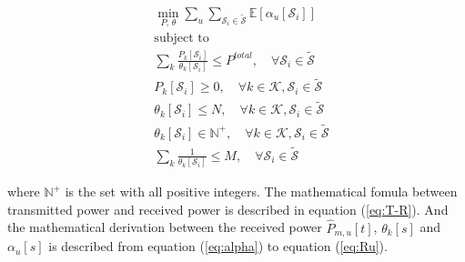 
\begin{subequations} \label{eq:main}
\begin{align}
    &\min_{P,\,\theta} \sum_{u} \sum_{\mathcal{S}_i\in \mathcal{\widetilde{S}}} \mathbb{E}[\alpha_u[\mathcal{S}_i]] \\ 
    &\text{subject to} \nonumber \\
    &\sum_{k} \frac{P_{k}[\mathcal{S}_i]}{\theta_k[\mathcal{S}_i]} \leq P^{total}, \quad \forall \mathcal{S}_i \in \mathcal{\widetilde{S}} \label{eq:power_constraint} \\ 
    &P_k[\mathcal{S}_i]\geq 0, \quad \forall k\in\mathcal{K}, \mathcal{S}_i\in\mathcal{\widetilde{S}} \label{eq:power_nonnegative} \\
    &\theta_k[\mathcal{S}_i] \leq N, \quad \forall k\in\mathcal{K}, \mathcal{S}_i\in\mathcal{\widetilde{S}} \label{eq:theta_upper} \\
    &\theta_k[\mathcal{S}_i] \in \mathbb{N}^+, \quad \forall k\in\mathcal{K}, \mathcal{S}_i\in\mathcal{\widetilde{S}} \label{eq:theta_positive} \\
    &\sum_k \frac{1}{\theta_k[\mathcal{S}_i]} \leq M, \quad \forall \mathcal{S}_i\in\mathcal{\widetilde{S}} \label{eq:sum_constraint}
\end{align}
\end{subequations}

where $\mathbb{N}^+$ is the set with all positive integers. The mathematical fomula between transmitted power and received power is described in equation (\ref{eq:T-R}). And the mathematical derivation between the received power $\hat{P}_{m, u}[t]$, $\theta_k[s]$ and $\alpha_u[s]$ is described from equation (\ref{eq:alpha}) to equation (\ref{eq:Ru}). 

